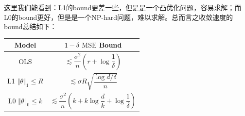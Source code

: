 \documentclass[11pt,a4paper]{ctexart}
\numberwithin{equation}{section}%
\begin{document}
这里我们能看到：L1的bound更差一些，但是是一个凸优化问题，容易求解；而L0的bound更好，但是是一个NP-hard问题，难以求解。总而言之收敛速度的bound总结如下：
\begin{table}[H]
    \centering
    \renewcommand\arraystretch{1.15}
    \begin{tabular}{cc}
        \hline
        Model & $ 1-\delta  $ $ \mathrm{ MSE }  $ Bound\\
        \hline
        OLS & $ \lesssim \dfrac{ \sigma ^2 }{ n } \left( r + \log \dfrac{ 1 }{ \delta  } \right)  $\\
        L1 $ \left\Vert \theta  \right\Vert _1 \leq R $ & $ \lesssim \sigma R\sqrt{\dfrac{ \log d/\delta  }{ n } }  $\\
        L0 $ \left\Vert \theta  \right\Vert _0 \leq k $ & $ \lesssim \dfrac{ \sigma ^2 }{ n }\left( k + k\log\dfrac{ d }{ k } + \log \dfrac{ 1 }{ \delta  }   \right) $\\
        \hline
    \end{tabular}
\end{table}








\end{document}
